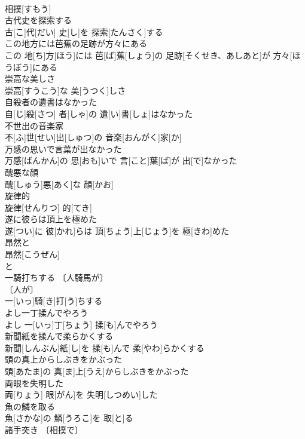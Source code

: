 \documentclass[8pt]{extreport}
\begin{document}
\begin{CJK}{UTF8}{min}
\\	相撲[すもう]
\\	古代史を探索する	
\\	古[こ]代[だい] 史[し]を 探索[たんさく]する
\\	この地方には芭蕉の足跡が方々にある	
\\	この 地[ち]方[ほう]には 芭[ば]蕉[しょう]の 足跡[そくせき、あしあと]が 方々[ほうぼう]にある
\\	崇高な美しさ	
\\	崇高[すうこう]な 美[うつく]しさ
\\	自殺者の遺書はなかった	
\\	自[じ]殺[さつ] 者[しゃ]の 遺[い]書[しょ]はなかった
\\	不世出の音楽家	
\\	不[ふ]世[せい]出[しゅつ]の 音楽[おんがく]家[か]
\\	万感の思いで言葉が出なかった	
\\	万感[ばんかん]の 思[おも]いで 言[こと]葉[ば]が 出[で]なかった
\\	醜悪な顔	
\\	醜[しゅう]悪[あく]な 顔[かお]
\\	旋律的	
\\	旋律[せんりつ] 的[てき]
\\	遂に彼らは頂上を極めた	
\\	遂[つい]に 彼[かれ]らは 頂[ちょう]上[じょう]を 極[きわ]めた
\\	昂然と	
\\	昂然[こうぜん]
\\	と
\\	一騎打ちする	〔人騎馬が〕
\\	〔人が〕
\\	一[いっ]騎[き]打[う]ちする
\\	よし一丁揉んでやろう	
\\	よし 一[いっ]丁[ちょう] 揉[も]んでやろう
\\	新聞紙を揉んで柔らかくする	
\\	新聞[しんぶん]紙[し]を 揉[も]んで 柔[やわ]らかくする
\\	頭の真上からしぶきをかぶった	
\\	頭[あたま]の 真[ま]上[うえ]からしぶきをかぶった
\\	両眼を失明した	
\\	両[りょう] 眼[がん]を 失明[しつめい]した
\\	魚の鱗を取る	
\\	魚[さかな]の 鱗[うろこ]を 取[と]る
\\	諸手突き	〔相撲で〕

\end{CJK}
\end{document}

